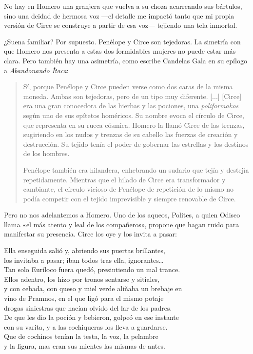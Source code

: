No hay en Homero una granjera que vuelva a su choza acarreando sus bártulos, sino una deidad de hermosa voz ---el detalle me impactó tanto que mi propia versión de Circe se construye a partir de esa voz--- tejiendo una tela inmortal.

¿Suena familiar? Por supuesto. Penélope y Circe son tejedoras. La simetría con que Homero nos presenta a estas dos formidables mujeres no puede estar más clara. Pero también hay una asimetría, como escribe Candelas Gala en su epílogo a \emph{Abandonando Ítaca}:

\begin{quotation}
Sí, porque Penélope y Circe pueden verse como dos caras de la misma moneda. Ambas son tejedoras, pero de un tipo muy diferente. [...] [Circe] era una gran conocedora de las hierbas y las pociones, una \emph{polifarmakos} según uno de sus epítetos homéricos. Su nombre evoca el círculo de Circe, que representa en su rueca cósmica. Homero la llamó Circe de las trenzas, sugiriendo en los nudos y trenzas de su cabello las fuerzas de creación y destrucción. Su tejido tenía el poder de gobernar las estrellas y los destinos de los hombres.

Penélope también era hilandera, enhebrando un sudario que tejía y destejía repetidamente. Mientras que el hilado de Circe era transformador y cambiante, el círculo vicioso de Penélope de repetición de lo mismo no podía competir con el tejido imprevisible y siempre renovable de Circe.
\end{quotation}

Pero no nos adelantemos a Homero. Uno de los aqueos, Polites, a quien Odiseo llama «el más atento y leal de los compañeros», propone que hagan ruido para manifestar su presencia. Circe los oye y los invita a pasar:

\begin{versocita}
Ella enseguida salió y, abriendo sus puertas brillantes,\\
los invitaba a pasar; iban todos tras ella, ignorantes…\\
Tan solo Euríloco fuera quedó, presintiendo un mal trance.\\
Ellos adentro, los hizo por tronos sentarse y sitiales,\\
y con cebada, con queso y miel verde aliñaba un brebaje en\\
vino de Pramnos, en el que ligó para el mismo potaje\\
drogas siniestras que hacían olvido del lar de los padres.\\
De que les dio la poción y bebieron, golpeó en ese instante\\
con su varita, y a las cochiqueras los lleva a guardarse.\\
Que de cochinos tenían la testa, la voz, la pelambre\\
y la figura, mas eran sus mientes las mismas de antes.
\end{versocita}

